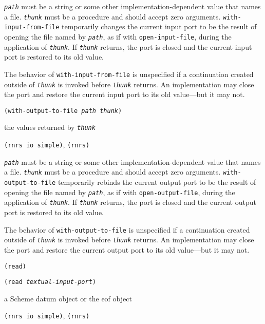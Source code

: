 \texttt{\textit{path}} must be a string or some other implementation-dependent 
value that names a file.
\texttt{\textit{thunk}} must be a procedure and should accept zero arguments.
\texttt{with-input-from-file} temporarily changes the current input port to be the
result of opening the file named by \texttt{\textit{path}}, as if with \texttt{open-input-file}, during the
application of \texttt{\textit{thunk}}.
If \texttt{\textit{thunk}} returns, the port is closed and the current input port
is restored to its old value.

The behavior of \texttt{with-input-from-file} is unspecified
if a continuation created outside
of \texttt{\textit{thunk}} is invoked before \texttt{\textit{thunk}} returns.
An implementation may close the port and restore the current input
port to its old value---but it may not.


\begin{description}

\label{io_s80}\item[procedure] \texttt{(with-output-to-file \textit{path} \textit{thunk})}



\item[returns] the values returned by \texttt{\textit{thunk}}


\item[libraries] \texttt{(rnrs io simple)}, \texttt{(rnrs)}
\end{description}

\texttt{\textit{path}} must be a string or some other implementation-dependent 
value that names a file.
\texttt{\textit{thunk}} must be a procedure and should accept zero arguments.
\texttt{with-output-to-file} temporarily rebinds the current output port to be the
result of opening the file named by \texttt{\textit{path}}, as if with \texttt{open-output-file},
during the application of \texttt{\textit{thunk}}.
If \texttt{\textit{thunk}} returns, the port is closed and the current output port
is restored to its old value.

The behavior of \texttt{with-output-to-file} is unspecified if a
continuation created outside of \texttt{\textit{thunk}} is invoked before
\texttt{\textit{thunk}} returns.
An implementation may close the port and restore the current output
port to its old value---but it may not.


\begin{description}

\label{io_s81}\item[procedure] \texttt{(read)}



\item[procedure] \texttt{(read \textit{textual-input-port})}



\item[returns] a Scheme datum object or the eof object


\item[libraries] \texttt{(rnrs io simple)}, \texttt{(rnrs)}
\end{description}


